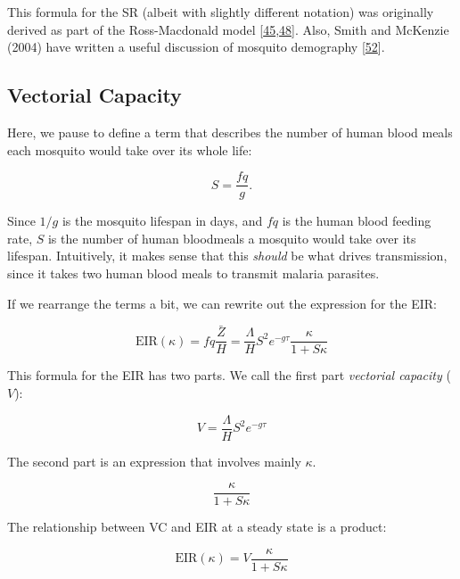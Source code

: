 \documentclass[
]{book}
\begin{document}
This formula for the SR (albeit with slightly different notation) was originally derived as part of the Ross-Macdonald model {[}\protect\hyperlink{ref-ArmitageP1953}{45},\protect\hyperlink{ref-MacdonaldG1952Sporozoite}{48}{]}. Also, Smith and McKenzie (2004) have written a useful discussion of mosquito demography {[}\protect\hyperlink{ref-SmithDL2004_Statics}{52}{]}.

\hypertarget{vectorial-capacity}{%
\subsection{Vectorial Capacity}\label{vectorial-capacity}}

Here, we pause to define a term that describes the number of human blood meals each mosquito would take over its whole life:

\[S = \frac{fq}{g}.\]

Since \(1/g\) is the mosquito lifespan in days, and \(fq\) is the human blood feeding rate, \(S\) is the number of human bloodmeals a mosquito would take over its lifespan. Intuitively, it makes sense that this \emph{should} be what drives transmission, since it takes two human blood meals to transmit malaria parasites.

If we rearrange the terms a bit, we can rewrite out the expression for the EIR:

\begin{equation}
\mbox{EIR}(\kappa) = fq \frac{\bar Z}{H} = \frac{\Lambda}{H} S^2  e^{-g\tau} \frac{\kappa}{1 + S \kappa} 
\end{equation}

This formula for the EIR has two parts. We call the first part \emph{vectorial capacity} (\(V\)):

\begin{equation}
V = \frac{\Lambda}{H} S^2  e^{-g\tau} 
\label{eq:VCdefined}
\end{equation}

The second part is an expression that involves mainly \(\kappa\).

\begin{equation}
\frac{\kappa}{1 + S \kappa} 
\label{eq:EIR2ndpart}
\end{equation}

The relationship between VC and EIR at a steady state is a product:

\begin{equation}
\mbox{EIR}(\kappa) = V \frac{\kappa}{1 + S \kappa} 
\label{eq:EIR2VC}
\end{equation}
\end{document}
